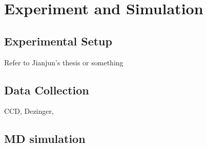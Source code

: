 \chapter{Experiment and Simulation}

\section{Experimental Setup}
Refer to Jianjun's thesis or something


\section{Data Collection}
CCD, Dezinger, 

\section{MD simulation}


